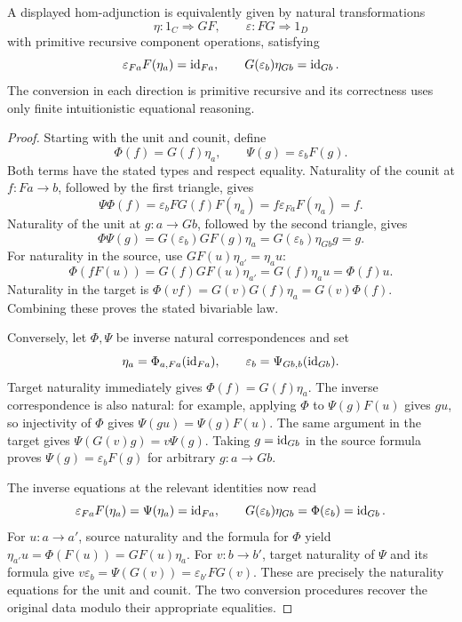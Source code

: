 \begin{theorem}\label{thm:adjunction}
A displayed hom-adjunction is equivalently given by natural transformations
\[
 \eta:1_C\Longrightarrow GF,\qquad
 \varepsilon:FG\Longrightarrow1_D
\]
with primitive recursive component operations, satisfying
\[
 \varepsilon_{Fa}F(\eta_a)=\operatorname{id}_{Fa},\qquad
 G(\varepsilon_b)\eta_{Gb}=\operatorname{id}_{Gb}.
\]
The conversion in each direction is primitive recursive and its correctness
uses only finite intuitionistic equational reasoning.
\end{theorem}
\begin{proof}
Starting with the unit and counit, define
\[
 \Phi(f)=G(f)\eta_a,\qquad \Psi(g)=\varepsilon_bF(g).
\]
Both terms have the stated types and respect equality.  Naturality of the
counit at $f:Fa\to b$, followed by the first triangle, gives
\[
 \Psi\Phi(f)
 =\varepsilon_bFG(f)F(\eta_a)
 =f\varepsilon_{Fa}F(\eta_a)=f.
\]
Naturality of the unit at $g:a\to Gb$, followed by the second triangle,
gives
\[
 \Phi\Psi(g)
 =G(\varepsilon_b)GF(g)\eta_a
 =G(\varepsilon_b)\eta_{Gb}g=g.
\]
For naturality in the source, use $GF(u)\eta_{a'}=\eta_a u$:
\[
 \Phi(fF(u))=G(f)GF(u)\eta_{a'}=G(f)\eta_a u=\Phi(f)u.
\]
Naturality in the target is
$\Phi(vf)=G(v)G(f)\eta_a=G(v)\Phi(f)$.  Combining these proves the stated
bivariable law.

Conversely, let $\Phi,\Psi$ be inverse natural correspondences and set
\[
 \eta_a=\Phi_{a,Fa}(\operatorname{id}_{Fa}),\qquad
 \varepsilon_b=\Psi_{Gb,b}(\operatorname{id}_{Gb}).
\]
Target naturality immediately gives
$\Phi(f)=G(f)\eta_a$.  The inverse correspondence is also natural: for
example, applying $\Phi$ to $\Psi(g)F(u)$ gives $gu$, so injectivity of
$\Phi$ gives $\Psi(gu)=\Psi(g)F(u)$.  The same argument in the target gives
$\Psi(G(v)g)=v\Psi(g)$.  Taking $g=\operatorname{id}_{Gb}$ in the source formula proves
$\Psi(g)=\varepsilon_bF(g)$ for arbitrary $g:a\to Gb$.

The inverse equations at the relevant identities now read
\[
 \varepsilon_{Fa}F(\eta_a)
 =\Psi(\eta_a)=\operatorname{id}_{Fa},\qquad
 G(\varepsilon_b)\eta_{Gb}
 =\Phi(\varepsilon_b)=\operatorname{id}_{Gb}.
\]
For $u:a\to a'$, source naturality and the formula for $\Phi$ yield
$\eta_{a'}u=\Phi(F(u))=GF(u)\eta_a$.  For $v:b\to b'$, target naturality
of $\Psi$ and its formula give
$v\varepsilon_b=\Psi(G(v))=\varepsilon_{b'}FG(v)$.  These are precisely
the naturality equations for the unit and counit.  The two conversion
procedures recover the original data modulo their appropriate equalities.
\end{proof}

